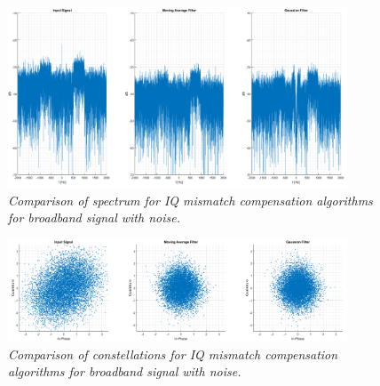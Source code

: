 \documentclass[en,printmode]{mgr}
\begin{document}
			\begin{figure}[H]
    			\centering
   				\includegraphics[width=0.9\textwidth]{plots/band_nf3.png}
   		 		\caption{\textit{Comparison of spectrum for IQ mismatch compensation algorithms for
   		 		broadband signal with noise.}}
   		 	\end{figure}	
   		 	\begin{figure}[H]
    			\centering
   				\includegraphics[width=0.9\textwidth]{plots/band_nc3.png}
   		 		\caption{\textit{Comparison of constellations for IQ mismatch compensation algorithms 
   		 		for broadband signal with noise.}}
   		 	\end{figure}
   		 	
\end{document}
